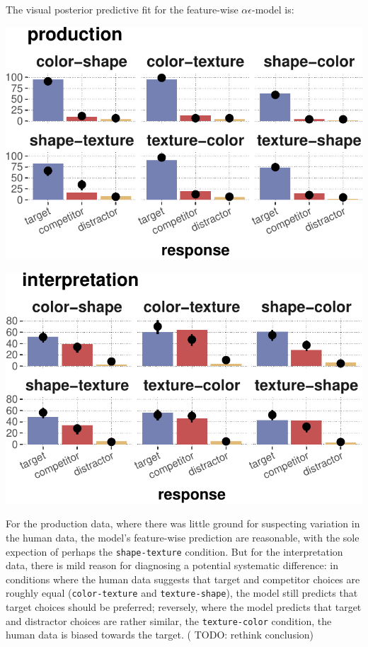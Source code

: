 \documentclass{article}
\begin{document}
The visual posterior predictive fit for the feature-wise
\(\alpha\epsilon\)-model is:

\includegraphics{00-pics/PPC-features-1.pdf}

\includegraphics{00-pics/PPC-features-2.pdf}

For the production data, where there was little ground for suspecting
variation in the human data, the model's feature-wise prediction are
reasonable, with the sole expection of perhaps the
\texttt{shape-texture} condition. But for the interpretation data, there
is mild reason for diagnosing a potential systematic difference: in
conditions where the human data suggests that target and competitor
choices are roughly equal (\texttt{color-texture} and
\texttt{texture-shape}), the model still predicts that target choices
should be preferred; reversely, where the model predicts that target and
distractor choices are rather similar, the \texttt{texture-color}
condition, the human data is biased towards the target. ( {TODO: rethink
conclusion})
\end{document}
